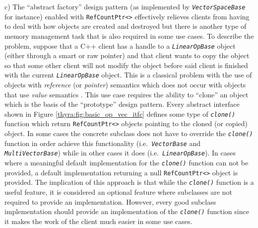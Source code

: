 \documentclass[pdf,ps2pdf,11pt]{SANDreport}
\begin{document}
c) The ``abstract factory'' design pattern (as implemented by
{}\texttt{\textit{Vector\-Space\-Base}} for instance) enabled with
{}\texttt{RefCountPtr<>} effectively relieves clients from having to
deal with how objects are created and destroyed but there is another
type of memory management task that is also required in some use
cases.  To describe the problem, suppose that a C++ client has a
handle to a {}\texttt{\textit{Linear\-Op\-Base}} object (either through a
smart or raw pointer) and that client wants to copy the object so that
some other client will not modify the object before said client is
finished with the current {}\texttt{\textit{Linear\-Op\-Base}} object.  This
is a classical problem with the use of objects with {\em reference}
(or {\em pointer}) semantics which does not occur with objects that
use {\em value} semantics {}\cite{ref:stroustrup_1997}.  This use case
requires the ability to ``clone'' an object which is the basis of the
``prototype'' design pattern.  Every abstract interface shown in
Figure {}\ref{thyra:fig:basic_op_vec_itfc} defines some type of
{}\texttt{\textit{clone()}} function which return
{}\texttt{RefCountPtr<>} objects pointing to the cloned (or copied)
object.  In some cases the concrete subclass does not have to override
the {}\texttt{\textit{clone()}} function in order achieve this
functionality (i.e.~\texttt{\textit{Vector\-Base}} and
{}\texttt{\textit{Multi\-Vector\-Base}}) while in other cases it does
(i.e.~\texttt{\textit{Linear\-Op\-Base}}).  In cases where a meaningful
default implementation for the {}\texttt{\textit{clone()}} function can
not be provided, a default implementation returning a null
{}\texttt{RefCountPtr<>} object is provided.  The implication of this
approach is that while the {}\texttt{\textit{clone()}} function is a
useful feature, it is considered an optional feature where subclasses
are not required to provide an implementation.  However, every good
subclass implementation should provide an implementation of the
{}\texttt{\textit{clone()}} function since it makes the work of the
client much easier in some use cases.
	
\end{document}
